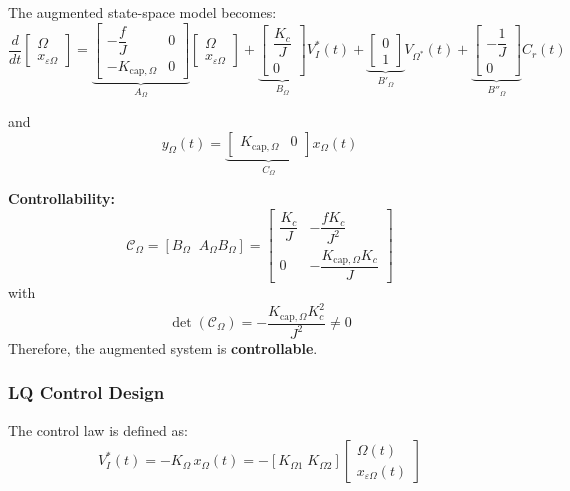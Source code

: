 \documentclass{rapportCS}
\begin{document}
The augmented state-space model becomes:
\begin{equation*}
\frac{d}{dt}
\begin{bmatrix}
\Omega \\[4pt]
x_{\varepsilon \Omega}
\end{bmatrix}
=
\underbrace{
\begin{bmatrix}
-\dfrac{f}{J} & 0 \\[6pt]
- K_{\mathrm{cap},\Omega} & 0
\end{bmatrix}}_{A_\Omega}
\begin{bmatrix}
\Omega \\[4pt]
x_{\varepsilon \Omega}
\end{bmatrix}
+
\underbrace{
\begin{bmatrix}
\dfrac{K_c}{J} \\[4pt]
0
\end{bmatrix}}_{B_\Omega}
V_I^*(t)
+
\underbrace{
\begin{bmatrix}
0 \\[4pt]
1
\end{bmatrix}}_{B'_\Omega}
V_{\Omega^*}(t)
+
\underbrace{
\begin{bmatrix}
-\dfrac{1}{J} \\[4pt]
0
\end{bmatrix}}_{B''_\Omega}
C_r(t)
\end{equation*}

and
\begin{equation*}
y_\Omega(t) =
\underbrace{
\begin{bmatrix}
K_{\mathrm{cap},\Omega} & 0
\end{bmatrix}}_{C_\Omega}
x_\Omega(t)
\end{equation*}

\noindent\textbf{Controllability:}
\[
\mathcal{C}_\Omega = [B_\Omega \;\; A_\Omega B_\Omega]
=
\begin{bmatrix}
\dfrac{K_c}{J} & -\dfrac{f K_c}{J^2} \\[6pt]
0 & -\dfrac{K_{\mathrm{cap},\Omega} K_c}{J}
\end{bmatrix}
\]
with
\[
\det(\mathcal{C}_\Omega) = -\frac{K_{\mathrm{cap},\Omega} K_c^2}{J^2} \neq 0
\]
Therefore, the augmented system is \textbf{controllable}.

\subsubsection{LQ Control Design}

The control law is defined as:
\begin{equation*}
V_I^*(t) = -K_\Omega\,x_\Omega(t)
= -[K_{\Omega1}\; K_{\Omega2}]
\begin{bmatrix}
\Omega(t) \\[4pt] x_{\varepsilon\Omega}(t)
\end{bmatrix}
\end{equation*}
\end{document}
